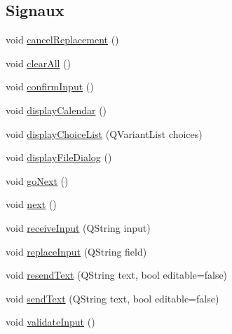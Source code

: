 \subsection*{Signaux}
\begin{DoxyCompactItemize}
\item 
void \hyperlink{classSH__InOutStateMachine_a035d37535533d4805fe2606f38c19380}{cancel\-Replacement} ()
\item 
void \hyperlink{classSH__InOutStateMachine_aa1d5860888c96ff94c55dc77e0fdfdcf}{clear\-All} ()
\item 
void \hyperlink{classSH__InOutStateMachine_a7f7d9c9300c1d05bce2c26029f28cc31}{confirm\-Input} ()
\item 
void \hyperlink{classSH__InOutStateMachine_ab3a12d1f9b658d8ffdc17669a6c065f2}{display\-Calendar} ()
\item 
void \hyperlink{classSH__InOutStateMachine_ab74b981b0aab09067d7479f2b7e79b0b}{display\-Choice\-List} (Q\-Variant\-List choices)
\item 
void \hyperlink{classSH__InOutStateMachine_abd206c3bc32bb7690df9c3e1cd546ebc}{display\-File\-Dialog} ()
\item 
void \hyperlink{classSH__GenericStateMachine_aec37e33524182ab83bf300f1cc1a064e}{go\-Next} ()
\item 
void \hyperlink{classSH__GenericStateMachine_af4771d31d87951c997fba1633c2d67f6}{next} ()
\item 
void \hyperlink{classSH__InOutStateMachine_a037ed5e13ecfae2123a8d4940292e410}{receive\-Input} (Q\-String input)
\item 
void \hyperlink{classSH__InOutStateMachine_a9fa5db44086de2576c812f631aa4f60a}{replace\-Input} (Q\-String field)
\item 
void \hyperlink{classSH__InOutStateMachine_a526822c66b46aa0cd81ba4473fa5573f}{resend\-Text} (Q\-String text, bool editable=false)
\item 
void \hyperlink{classSH__InOutStateMachine_a5e7f5958bae31696b6a8deab94ad2b4f}{send\-Text} (Q\-String text, bool editable=false)
\item 
void \hyperlink{classSH__InOutStateMachine_aec1b3fef3c1f82499aa1f73beaecd08a}{validate\-Input} ()
\end{DoxyCompactItemize}
